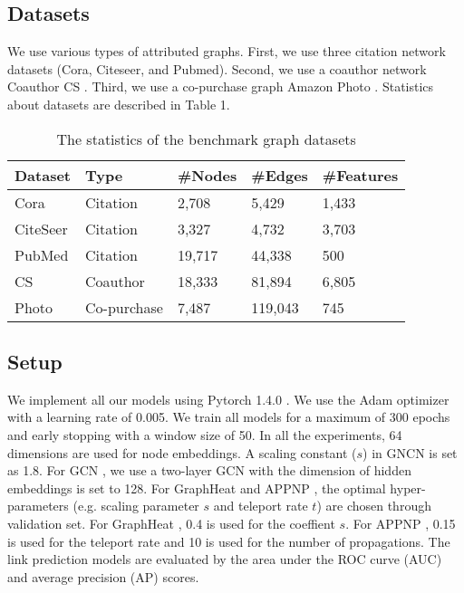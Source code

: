 \documentclass[sigconf]{acmart}
\begin{document}
\subsection{Datasets}
We use various types of attributed graphs.
First, we use three citation network datasets (Cora, Citeseer, and Pubmed).
Second, we use a coauthor network Coauthor CS \cite{shchur2018pitfalls}.
Third, we use a co-purchase graph Amazon Photo \cite{shchur2018pitfalls}.
Statistics about datasets are described in Table 1.
\begin{table}
  \caption{The statistics of the benchmark graph datasets}
  \label{sample-table}
  \centering
  \begin{tabular}{lllll}
    \toprule
    Dataset & Type  &  {\#}Nodes     & {\#}Edges  & {\#}Features \\
    \midrule
    \midrule
    Cora    & Citation  & 2,708  &  5,429  &  1,433     \\
    CiteSeer & Citation & 3,327   &  4,732  &  3,703    \\
    PubMed & Citation & 19,717  &  44,338 &  500 \\
    CS & Coauthor & 18,333 & 81,894 & 6,805 \\
    Photo & Co-purchase & 7,487 & 119,043 & 745 \\
    \bottomrule
  \end{tabular}
\end{table}

\subsection{Setup}
We implement all our models using Pytorch 1.4.0 \cite{paszke2019pytorch}.
We use the Adam optimizer \cite{kingma2014adam} with a learning rate of 0.005.
We train all models for a maximum of 300 epochs and early stopping with a window size of 50.
In all the experiments, 64 dimensions are used for node embeddings.
A scaling constant ($s$) in GNCN is set as 1.8.
For GCN \cite{kipf2016semi}, we use a two-layer GCN with the dimension of hidden embeddings is set to 128.
For GraphHeat \cite{xu2020graph} and APPNP \cite{klicpera2018predict}, the optimal hyper-parameters (e.g. scaling parameter $s$ and teleport rate $t$) are chosen through validation set.
For GraphHeat \cite{xu2020graph}, 0.4 is used for the coeffient $s$.
For APPNP \cite{klicpera2018predict}, 0.15 is used for the teleport rate and 10 is used for the number of propagations.
The link prediction models are evaluated by the area under the ROC curve (AUC) and average precision (AP) scores. 
\end{document}
